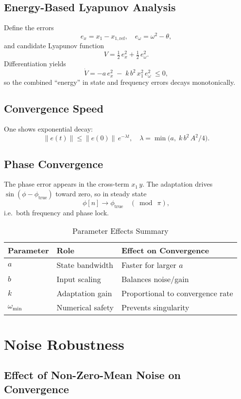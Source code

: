 \documentclass[11pt,letterpaper]{article}
\begin{document}
\subsection{Energy-Based Lyapunov Analysis}
Define the errors
\[
e_x = x_1 - x_{1,\mathrm{ref}}, 
\quad
e_\omega = \omega^2 - \theta,
\]
and candidate Lyapunov function
\[
V = \tfrac12\,e_x^2 + \tfrac12\,e_\omega^2.
\]
Differentiation yields
\[
\dot{V} = -a\,e_x^2 \;-\; k\,b^2\,x_1^2\,e_\omega^2 \;\le 0,
\]
so the combined “energy” in state and frequency errors decays monotonically.

\subsection{Convergence Speed}
One shows exponential decay:
\[
\|e(t)\|\le \|e(0)\|\,e^{-\lambda t},\quad
\lambda = \min\bigl(a,\;k\,b^2\,A^2/4\bigr).
\]

\subsection{Phase Convergence}
The phase error appears in the cross-term \(x_1\,y\).  The adaptation drives 
\(\sin(\phi-\phi_{\mathrm{true}})\) toward zero, so in steady state
\[
\phi[n]\to\phi_{\mathrm{true}}\quad (\bmod\ \pi),
\]
i.e.\ both frequency and phase lock.

\begin{table}[h]
\centering
\caption{Parameter Effects Summary}
\begin{tabular}{lll}
Parameter       & Role               & Effect on Convergence            \\
\hline
$a$              & State bandwidth    & Faster for larger \(a\)          \\
$b$              & Input scaling      & Balances noise/gain              \\
$k$              & Adaptation gain    & Proportional to convergence rate \\
$\omega_{\min}$ & Numerical safety   & Prevents singularity             \\
\end{tabular}
\end{table}

\section{Noise Robustness}

\subsection{Effect of Non-Zero-Mean Noise on Convergence}
\end{document}
